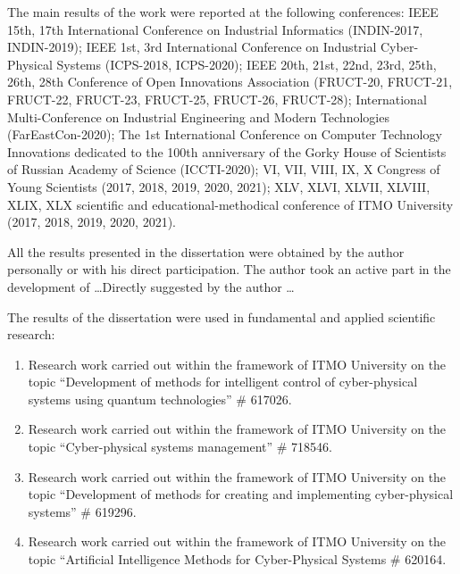 {\probationEn}
The main results of the work were reported at the following conferences: IEEE 15th, 17th International Conference on Industrial Informatics (INDIN-2017, INDIN-2019); IEEE 1st, 3rd International Conference on Industrial Cyber-Physical Systems (ICPS-2018, ICPS-2020); IEEE 20th, 21st, 22nd, 23rd, 25th, 26th, 28th Conference of Open Innovations Association (FRUCT-20, FRUCT-21, FRUCT-22, FRUCT-23, FRUCT-25, FRUCT-26, FRUCT-28); International Multi-Conference on Industrial Engineering and Modern Technologies (FarEastCon-2020); The 1st International Conference on Computer Technology Innovations dedicated to the 100th anniversary of the Gorky House of Scientists of Russian Academy of Science (ICCTI-2020); VI, VII, VIII, IX, X  Congress of Young Scientists (2017, 2018, 2019, 2020, 2021); XLV, XLVI, XLVII, XLVIII, XLIX, XLX  scientific and educational-methodical conference of {ITMO} University (2017, 2018, 2019, 2020, 2021).


{\contributionEn} All the results presented in the dissertation were obtained by the author personally or with his direct participation. The author took an active part in the development of \dots Directly suggested by the author \dots

{\implementationEn} The results of the dissertation were used in fundamental and applied scientific research:

\begin{enumerate}[beginpenalty=10000]
	\item Research work carried out within the framework of ITMO University on the topic ``Development of methods for intelligent control of cyber-physical systems using quantum technologies'' \# 617026.
	\item Research work carried out within the framework of ITMO University on the topic ``Cyber-physical systems management''  \# 718546.
	\item Research work carried out within the framework of ITMO University on the topic ``Development of methods for creating and implementing cyber-physical systems'' \# 619296.
	\item Research work carried out within the framework of ITMO University on the topic ``Artificial Intelligence Methods for Cyber-Physical Systems \# 620164.
\end{enumerate}


